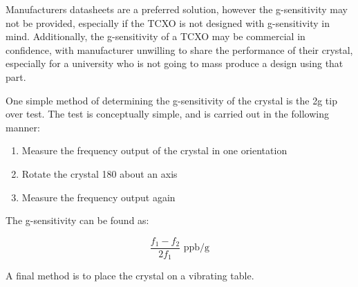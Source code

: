 Manufacturers datasheets are a preferred solution, however the g-sensitivity may not be provided, especially if the \ac{TCXO} is not designed with g-sensitivity in mind. Additionally,  the g-sensitivity of a \ac{TCXO} may be commercial in confidence, with manufacturer unwilling to share the performance of their crystal, especially for a university who is not going to mass produce a design using that part. 

One simple method of determining the g-sensitivity of the crystal is the 2g tip over test. The test is conceptually simple, and is carried out in the following manner:

\begin{enumerate}
\item{Measure the frequency output of the crystal in one orientation}
\item{Rotate the crystal 180 \degree about an axis}
\item{Measure the frequency output again}
\end{enumerate}

 The g-sensitivity can be found as:

\begin{equation}
\frac{f_1-f_2}{2 f_1}\text{ ppb/g}
\end{equation}

A final method is to place the crystal on a vibrating table. 

\begin{comment}
In recent years significant progress has been made in
crystal resonator design to effect a substantial reduction in
g-sensitivity values [1]. With such reduced levels of
acceleration sensitivity, the need has arisen for a
measurement system with appropriately higher resolution.
The most obvious method for determination of g-sensitivity
for a stable ovenized oscillator is the '2g tip over
test', where the whole oscillator is simply inverted, resulting
in an incremental 2g change in the internal forces applied to
the resonator [2]. However, since the changes are in the
order of 1.10-9 per g, the oscillator temperature must be prestabilized,
and this can be a long process. With this method,
care must also be taken to avoid convectional temperature
effects in the oven cavity, which can cause misleading
results.
In this work, for g-sensitivity measurement, the method
that has been implemented is based on the imposition of an
essentially sinusoidal low frequency vibration field on the
resonator by placing the device on a vibration table, and
then observing the modulation effects on the resonator
frequency.
The method is applicable to any repetitive stimulus to
which the frequency of the resonator exhibits sensitivity.
Such stimuli could include pressure, electromagnetic
radiation effects, magnetic fields, neutron radiation, and so
on.
\end{comment}

